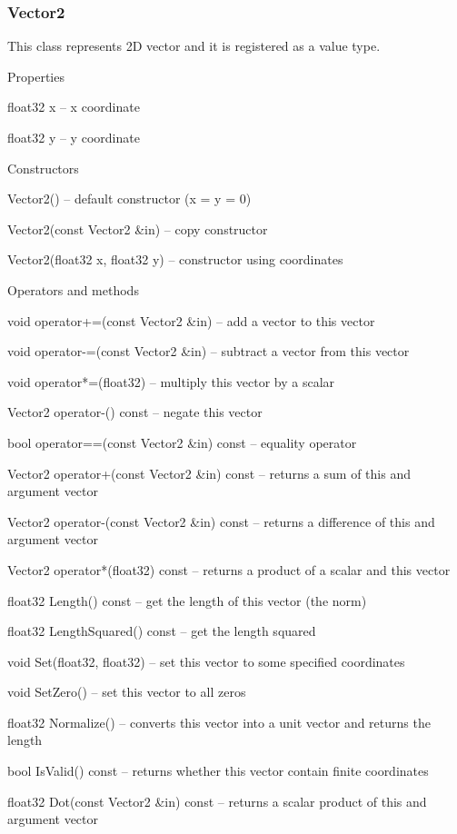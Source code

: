 \documentclass[12pt, a4paper]{article}
\newenvironment{titled-itemize}[1]
{
\vspace{5mm}
\noindent\textbf{#1}
\begin{itemize}
}
{
\end{itemize}
}
\begin{document}
\subsubsection{Vector2}

This class represents 2D vector and it is registered as a value type.

\begin{titled-itemize}{Properties}
  \item float32 x -- x coordinate
  \item float32 y -- y coordinate
\end{titled-itemize}

\begin{titled-itemize}{Constructors}
  \item Vector2() -- default constructor (x = y = 0)
  \item Vector2(const Vector2 \&in) -- copy constructor
  \item Vector2(float32 x, float32 y)  -- constructor using coordinates
\end{titled-itemize}

\begin{titled-itemize}{Operators and methods}
  \item void operator+=(const Vector2 \&in) -- add a vector to this vector
  \item void operator-=(const Vector2 \&in) -- subtract a vector from this vector
  \item void operator*=(float32) -- multiply this vector by a scalar
  \item Vector2 operator-() const -- negate this vector
  \item bool operator==(const Vector2 \&in) const -- equality operator
  \item Vector2 operator+(const Vector2 \&in) const -- returns a sum of this and argument vector
  \item Vector2 operator-(const Vector2 \&in) const -- returns a difference of this and argument vector
  \item Vector2 operator*(float32) const -- returns a product of a scalar and this vector
  \item float32 Length() const -- get the length of this vector (the norm)
  \item float32 LengthSquared() const -- get the length squared
  \item void Set(float32, float32) -- set this vector to some specified coordinates
  \item void SetZero() -- set this vector to all zeros
  \item float32 Normalize() -- converts this vector into a unit vector and returns the length
  \item bool IsValid() const -- returns whether this vector contain finite coordinates
  \item float32 Dot(const Vector2 \&in) const -- returns a scalar product of this and argument vector
\end{titled-itemize}
\end{document}
